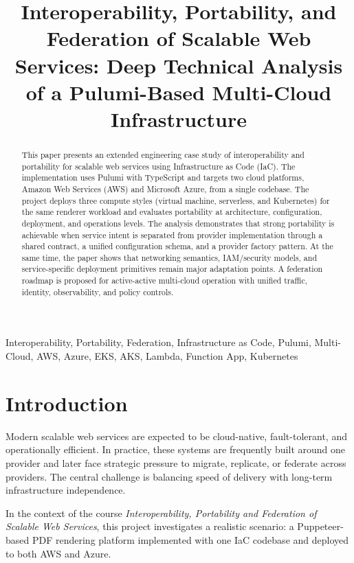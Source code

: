 \documentclass[conference]{IEEEtran}
\begin{document}
\title{Interoperability, Portability, and Federation of Scalable Web Services:
Deep Technical Analysis of a Pulumi-Based Multi-Cloud Infrastructure}

\author{
}

\maketitle

\begin{abstract}
This paper presents an extended engineering case study of interoperability and portability for scalable web services using Infrastructure as Code (IaC). The implementation uses Pulumi with TypeScript and targets two cloud platforms, Amazon Web Services (AWS) and Microsoft Azure, from a single codebase. The project deploys three compute styles (virtual machine, serverless, and Kubernetes) for the same renderer workload and evaluates portability at architecture, configuration, deployment, and operations levels. The analysis demonstrates that strong portability is achievable when service intent is separated from provider implementation through a shared contract, a unified configuration schema, and a provider factory pattern. At the same time, the paper shows that networking semantics, IAM/security models, and service-specific deployment primitives remain major adaptation points. A federation roadmap is proposed for active-active multi-cloud operation with unified traffic, identity, observability, and policy controls.
\end{abstract}

\begin{IEEEkeywords}
Interoperability, Portability, Federation, Infrastructure as Code, Pulumi, Multi-Cloud, AWS, Azure, EKS, AKS, Lambda, Function App, Kubernetes
\end{IEEEkeywords}

\section{Introduction}
Modern scalable web services are expected to be cloud-native, fault-tolerant, and operationally efficient. In practice, these systems are frequently built around one provider and later face strategic pressure to migrate, replicate, or federate across providers. The central challenge is balancing speed of delivery with long-term infrastructure independence.

In the context of the course \textit{Interoperability, Portability and Federation of Scalable Web Services}, this project investigates a realistic scenario: a Puppeteer-based PDF rendering platform implemented with one IaC codebase and deployed to both AWS and Azure.
\end{document}
